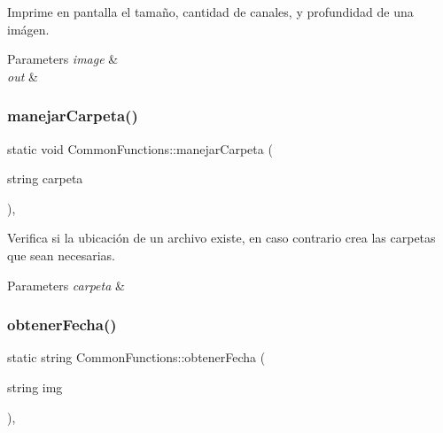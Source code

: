 Imprime en pantalla el tamaño, cantidad de canales, y profundidad de una imágen. 


\begin{DoxyParams}{Parameters}
{\em image} & \\
\hline
{\em out} & \\
\hline
\end{DoxyParams}
\mbox{\label{classCommonFunctions_a8f31532bc3dd60e5c95d40daaef7c705}} 
\subsubsection{\texorpdfstring{manejar\+Carpeta()}{manejarCarpeta()}}
{\footnotesize\ttfamily static void Common\+Functions\+::manejar\+Carpeta (\begin{DoxyParamCaption}\item[{string}]{carpeta }\end{DoxyParamCaption})\hspace{0.3cm}{\ttfamily [inline]}, {\ttfamily [static]}}



Verifica si la ubicación de un archivo existe, en caso contrario crea las carpetas que sean necesarias. 


\begin{DoxyParams}{Parameters}
{\em carpeta} & \\
\hline
\end{DoxyParams}
\mbox{\label{classCommonFunctions_a6b4829d1fab8cd74c15c540cf97fe237}} 
\subsubsection{\texorpdfstring{obtener\+Fecha()}{obtenerFecha()}}
{\footnotesize\ttfamily static string Common\+Functions\+::obtener\+Fecha (\begin{DoxyParamCaption}\item[{string}]{img }\end{DoxyParamCaption})\hspace{0.3cm}{\ttfamily [inline]}, {\ttfamily [static]}}



